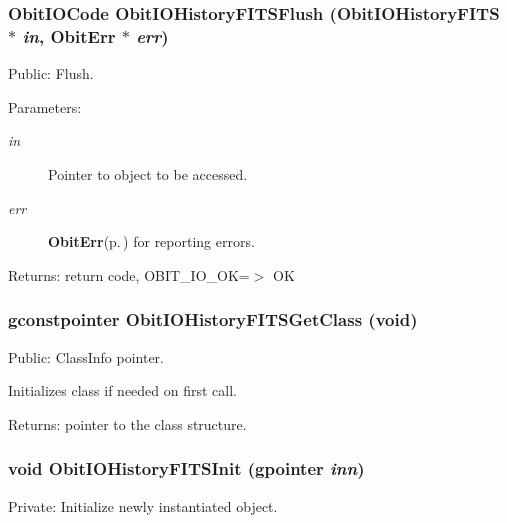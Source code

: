 \subsubsection{\setlength{\rightskip}{0pt plus 5cm}Obit\-IOCode Obit\-IOHistory\-FITSFlush ({\bf Obit\-IOHistory\-FITS} $\ast$ {\em in}, {\bf Obit\-Err} $\ast$ {\em err})}\label{ObitIOHistoryFITS_8c_a20}


Public: Flush. 

\begin{Desc}
\item[Parameters:]
\begin{description}
\item[{\em in}]Pointer to object to be accessed. \item[{\em err}]{\bf Obit\-Err}{\rm (p.\,\pageref{structObitErr})} for reporting errors. \end{description}
\end{Desc}
\begin{Desc}
\item[Returns:]return code, OBIT\_\-IO\_\-OK=$>$ OK \end{Desc}
\subsubsection{\setlength{\rightskip}{0pt plus 5cm}gconstpointer Obit\-IOHistory\-FITSGet\-Class (void)}\label{ObitIOHistoryFITS_8c_a8}


Public: Class\-Info pointer. 

Initializes class if needed on first call. \begin{Desc}
\item[Returns:]pointer to the class structure. \end{Desc}
\subsubsection{\setlength{\rightskip}{0pt plus 5cm}void Obit\-IOHistory\-FITSInit (gpointer {\em inn})}\label{ObitIOHistoryFITS_8c_a3}


Private: Initialize newly instantiated object. 


